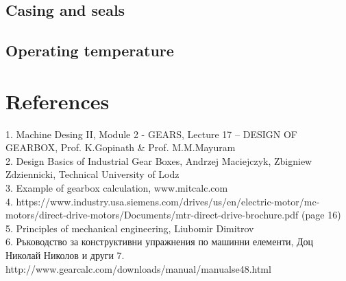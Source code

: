 \documentclass{article}
\begin{document}
\subsection{Casing and seals}
\subsection{Operating temperature}

\section{References}
1. Machine Desing II, Module 2 - GEARS, Lecture 17 – DESIGN OF GEARBOX, Prof. K.Gopinath \& Prof. M.M.Mayuram \\
2. Design Basics of Industrial Gear Boxes, Andrzej Maciejczyk, Zbigniew Zdziennicki, Technical University of Lodz \\
3. Example of gearbox calculation, www.mitcalc.com \\
4. https://www.industry.usa.siemens.com/drives/us/en/electric-motor/mc-motors/direct-drive-motors/Documents/mtr-direct-drive-brochure.pdf  (page 16) \\
5. Principles of mechanical engineering, Liubomir Dimitrov  \\
6. Ръководство за конструктивни упражнения по машинни елементи, Доц Николай Николов и други
7. http://www.gearcalc.com/downloads/manual/manualse48.html

\tableofcontents
\end{document}

